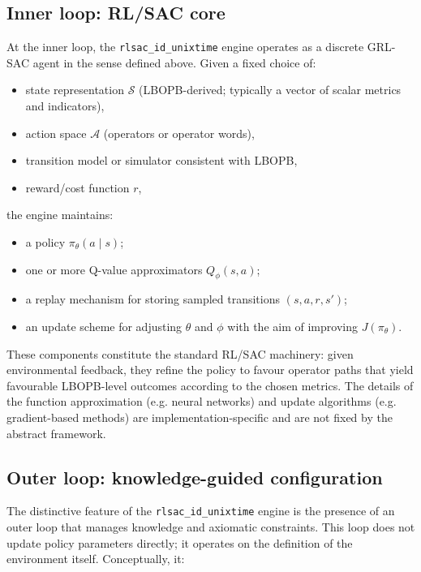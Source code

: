 \documentclass[11pt]{book}
\theoremstyle{plain}
\theoremstyle{definition}
\theoremstyle{remark}
\begin{document}
\subsection*{Inner loop: RL/SAC core}

At the inner loop, the \texttt{rlsac\_id\_unixtime} engine operates as
a discrete GRL-SAC agent in the sense defined above. Given a fixed
choice of:

\begin{itemize}
  \item state representation $\mathcal{S}$ (LBOPB-derived;
        typically a vector of scalar metrics and indicators),
  \item action space $\mathcal{A}$ (operators or operator words),
  \item transition model or simulator consistent with LBOPB,
  \item reward/cost function $r$,
\end{itemize}
the engine maintains:

\begin{itemize}
  \item a policy $\pi_{\theta}(a \mid s)$;
  \item one or more Q-value approximators $Q_{\phi}(s,a)$;
  \item a replay mechanism for storing sampled transitions
        $(s,a,r,s')$;
  \item an update scheme for adjusting $\theta$ and $\phi$ with the
        aim of improving $J(\pi_{\theta})$.
\end{itemize}

These components constitute the standard RL/SAC machinery: given
environmental feedback, they refine the policy to favour operator
paths that yield favourable LBOPB-level outcomes according to the
chosen metrics. The details of the function approximation (e.g. neural
networks) and update algorithms (e.g. gradient-based methods) are
implementation-specific and are not fixed by the abstract framework.

\subsection*{Outer loop: knowledge-guided configuration}

The distinctive feature of the \texttt{rlsac\_id\_unixtime} engine is
the presence of an outer loop that manages knowledge and axiomatic
constraints. This loop does not update policy parameters directly; it
operates on the definition of the environment itself. Conceptually, it:
\end{document}
